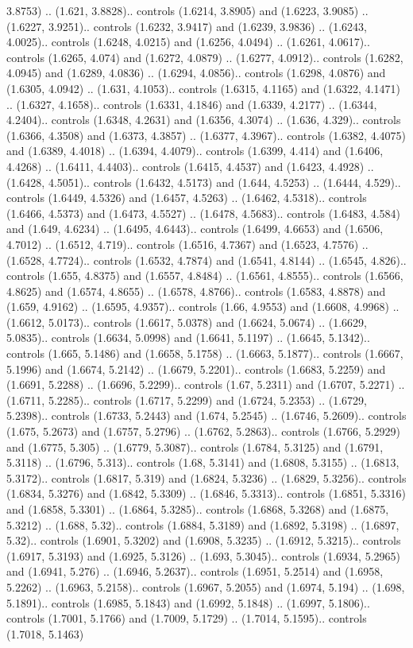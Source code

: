 3.8753) .. (1.621, 3.8828).. controls (1.6214, 3.8905) and (1.6223, 3.9085) .. (1.6227, 3.9251).. controls (1.6232, 3.9417) and (1.6239, 3.9836) .. (1.6243, 4.0025).. controls (1.6248, 4.0215) and (1.6256, 4.0494) .. (1.6261, 4.0617).. controls (1.6265, 4.074) and (1.6272, 4.0879) .. (1.6277, 4.0912).. controls (1.6282, 4.0945) and (1.6289, 4.0836) .. (1.6294, 4.0856).. controls (1.6298, 4.0876) and (1.6305, 4.0942) .. (1.631, 4.1053).. controls (1.6315, 4.1165) and (1.6322, 4.1471) .. (1.6327, 4.1658).. controls (1.6331, 4.1846) and (1.6339, 4.2177) .. (1.6344, 4.2404).. controls (1.6348, 4.2631) and (1.6356, 4.3074) .. (1.636, 4.329).. controls (1.6366, 4.3508) and (1.6373, 4.3857) .. (1.6377, 4.3967).. controls (1.6382, 4.4075) and (1.6389, 4.4018) .. (1.6394, 4.4079).. controls (1.6399, 4.414) and (1.6406, 4.4268) .. (1.6411, 4.4403).. controls (1.6415, 4.4537) and (1.6423, 4.4928) .. (1.6428, 4.5051).. controls (1.6432, 4.5173) and (1.644, 4.5253) .. (1.6444, 4.529).. controls (1.6449, 4.5326) and (1.6457, 4.5263) .. (1.6462, 4.5318).. controls (1.6466, 4.5373) and (1.6473, 4.5527) .. (1.6478, 4.5683).. controls (1.6483, 4.584) and (1.649, 4.6234) .. (1.6495, 4.6443).. controls (1.6499, 4.6653) and (1.6506, 4.7012) .. (1.6512, 4.719).. controls (1.6516, 4.7367) and (1.6523, 4.7576) .. (1.6528, 4.7724).. controls (1.6532, 4.7874) and (1.6541, 4.8144) .. (1.6545, 4.826).. controls (1.655, 4.8375) and (1.6557, 4.8484) .. (1.6561, 4.8555).. controls (1.6566, 4.8625) and (1.6574, 4.8655) .. (1.6578, 4.8766).. controls (1.6583, 4.8878) and (1.659, 4.9162) .. (1.6595, 4.9357).. controls (1.66, 4.9553) and (1.6608, 4.9968) .. (1.6612, 5.0173).. controls (1.6617, 5.0378) and (1.6624, 5.0674) .. (1.6629, 5.0835).. controls (1.6634, 5.0998) and (1.6641, 5.1197) .. (1.6645, 5.1342).. controls (1.665, 5.1486) and (1.6658, 5.1758) .. (1.6663, 5.1877).. controls (1.6667, 5.1996) and (1.6674, 5.2142) .. (1.6679, 5.2201).. controls (1.6683, 5.2259) and (1.6691, 5.2288) .. (1.6696, 5.2299).. controls (1.67, 5.2311) and (1.6707, 5.2271) .. (1.6711, 5.2285).. controls (1.6717, 5.2299) and (1.6724, 5.2353) .. (1.6729, 5.2398).. controls (1.6733, 5.2443) and (1.674, 5.2545) .. (1.6746, 5.2609).. controls (1.675, 5.2673) and (1.6757, 5.2796) .. (1.6762, 5.2863).. controls (1.6766, 5.2929) and (1.6775, 5.305) .. (1.6779, 5.3087).. controls (1.6784, 5.3125) and (1.6791, 5.3118) .. (1.6796, 5.313).. controls (1.68, 5.3141) and (1.6808, 5.3155) .. (1.6813, 5.3172).. controls (1.6817, 5.319) and (1.6824, 5.3236) .. (1.6829, 5.3256).. controls (1.6834, 5.3276) and (1.6842, 5.3309) .. (1.6846, 5.3313).. controls (1.6851, 5.3316) and (1.6858, 5.3301) .. (1.6864, 5.3285).. controls (1.6868, 5.3268) and (1.6875, 5.3212) .. (1.688, 5.32).. controls (1.6884, 5.3189) and (1.6892, 5.3198) .. (1.6897, 5.32).. controls (1.6901, 5.3202) and (1.6908, 5.3235) .. (1.6912, 5.3215).. controls (1.6917, 5.3193) and (1.6925, 5.3126) .. (1.693, 5.3045).. controls (1.6934, 5.2965) and (1.6941, 5.276) .. (1.6946, 5.2637).. controls (1.6951, 5.2514) and (1.6958, 5.2262) .. (1.6963, 5.2158).. controls (1.6967, 5.2055) and (1.6974, 5.194) .. (1.698, 5.1891).. controls (1.6985, 5.1843) and (1.6992, 5.1848) .. (1.6997, 5.1806).. controls (1.7001, 5.1766) and (1.7009, 5.1729) .. (1.7014, 5.1595).. controls (1.7018, 5.1463) 